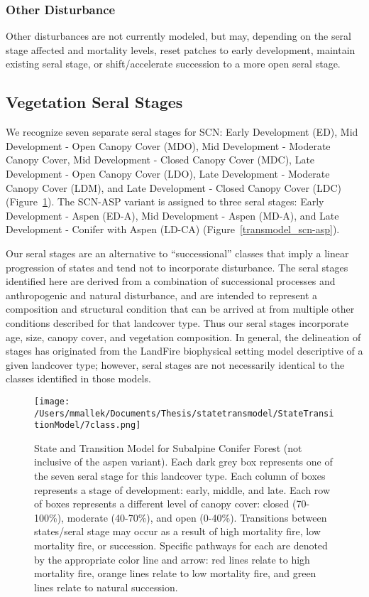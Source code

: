 \subsubsection{Other Disturbance}
Other disturbances are not currently modeled, but may, depending on the seral stage affected and mortality levels, reset patches to early development, maintain existing seral stage, or shift/accelerate succession to a more open seral stage. 

\subsection*{Vegetation Seral Stages}
We recognize seven separate seral stages for SCN: Early Development (ED), Mid Development - Open Canopy Cover (MDO), Mid Development - Moderate Canopy Cover, Mid Development - Closed Canopy Cover (MDC), Late Development - Open Canopy Cover (LDO), Late Development - Moderate Canopy Cover (LDM), and Late Development - Closed Canopy Cover (LDC) (Figure~\ref{transmodel_scn}). The SCN-ASP variant is assigned to three seral stages: Early Development - Aspen (ED-A), Mid Development - Aspen (MD-A), and Late Development - Conifer with Aspen (LD-CA) (Figure~\ref{transmodel_scn-asp}).

Our seral stages are an alternative to ``successional'' classes that imply a linear progression of states and tend not to incorporate disturbance. The seral stages identified here are derived from a combination of successional processes and anthropogenic and natural disturbance, and are intended to represent a composition and structural condition that can be arrived at from multiple other conditions described for that landcover type. Thus our seral stages incorporate age, size, canopy cover, and vegetation composition. In general, the delineation of stages has originated from the LandFire biophysical setting model descriptive of a given landcover type; however, seral stages are not necessarily identical to the classes identified in those models.


\begin{figure}[htbp]
\centering
\texttt{[image: /Users/mmallek/Documents/Thesis/statetransmodel/StateTransitionModel/7class.png]}
\caption{State and Transition Model for Subalpine Conifer Forest (not inclusive of the aspen variant). Each dark grey box represents one of the seven seral stage for this landcover type. Each column of boxes represents a stage of development: early, middle, and late. Each row of boxes represents a different level of canopy cover: closed (70-100\%), moderate (40-70\%), and open (0-40\%). Transitions between states/seral stage may occur as a result of high mortality fire, low mortality fire, or succession. Specific pathways for each are denoted by the appropriate color line and arrow: red lines relate to high mortality fire, orange lines relate to low mortality fire, and green lines relate to natural succession.} 
\label{transmodel_scn}
\end{figure}

